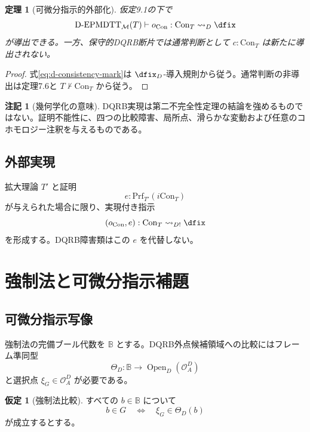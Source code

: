 \documentclass[a4paper,11pt]{ltjsarticle}
\theoremstyle{definition}
\newtheorem{assumption}[definition]{仮定}
\newtheorem{remark}[definition]{注記}
\theoremstyle{plain}
\newtheorem{theorem}[definition]{定理}
\newcommand{\DEPMDTT}{\mathrm{D}\text{-}\mathrm{EPMDTT}}
\newcommand{\Prf}{\mathrm{Prf}}
\newcommand{\Con}{\mathrm{Con}}
\newcommand{\OpenD}{\operatorname{Open}_{D}}
\newcommand{\Meta}{\mathcal M}
\begin{document}
\begin{theorem}[可微分指示的外部化]
仮定9.1の下で
\begin{equation}
 \DEPMDTT_{\Meta}(T)\vdash
 o_{\Con}:\Con_T\rightsquigarrow_D\dfix
 \label{eq:d-consistency-mark}
\end{equation}
が導出できる。一方、保守的DQRB断片では通常判断として $c:\Con_T$ は新たに導出されない。
\end{theorem}

\begin{proof}
式\eqref{eq:d-consistency-mark}は $\dfix_D$-導入規則から従う。通常判断の非導出は定理7.6と $T\nvdash\Con_T$ から従う。
\end{proof}

\begin{remark}[幾何学化の意味]
DQRB実現は第二不完全性定理の結論を強めるものではない。証明不能性に、四つの比較障害、局所点、滑らかな変動および任意のコホモロジー注釈を与えるものである。
\end{remark}

\subsection{外部実現}

拡大理論 $T'$ と証明
\begin{equation}
 e:\Prf_{T'}(i\Con_T)
\end{equation}
が与えられた場合に限り、実現付き指示
\begin{equation}
 (o_{\Con},e):\Con_T
 \rightsquigarrow_{D!}\dfix
\end{equation}
を形成する。DQRB障害類はこの $e$ を代替しない。

\section{強制法と可微分指示補題}

\subsection{可微分指示写像}

強制法の完備ブール代数を $\mathbb B$ とする。DQRB外点候補領域への比較にはフレーム準同型
\begin{equation}
 \Theta_D:\mathbb B\longrightarrow
 \OpenD(\mathcal O_A^D)
 \label{eq:differential-theta}
\end{equation}
と選択点 $\xi_G\in\mathcal O_A^D$ が必要である。

\begin{assumption}[強制法比較]
すべての $b\in\mathbb B$ について
\begin{equation}
 b\in G
 \quad\Longleftrightarrow\quad
 \xi_G\in\Theta_D(b)
 \label{eq:forcing-comparison}
\end{equation}
が成立するとする。
\end{assumption}
\end{document}
